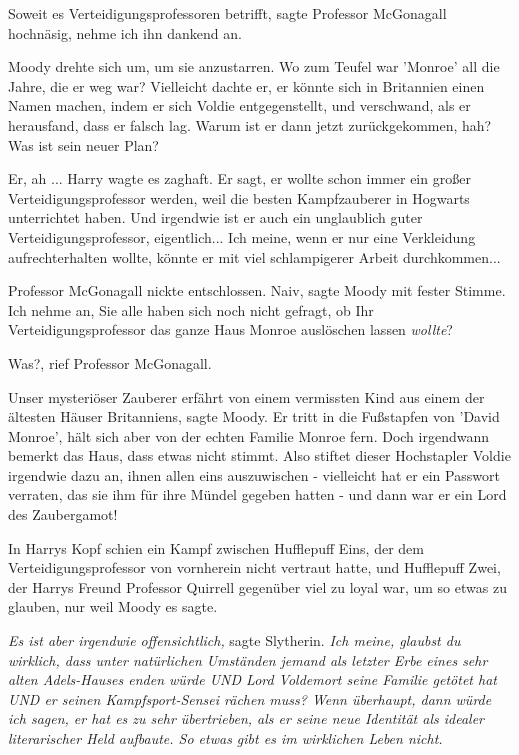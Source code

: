 \glqq Soweit es Verteidigungsprofessoren betrifft\grqq{}, sagte Professor
McGonagall hochnäsig, \glqq nehme ich ihn dankend an.\grqq{}

Moody drehte sich um, um sie anzustarren. \glqq Wo zum Teufel war 'Monroe' all
die Jahre, die er weg war? Vielleicht dachte er, er könnte sich in Britannien
einen Namen machen, indem er sich Voldie entgegenstellt, und verschwand, als er
herausfand, dass er falsch lag. Warum ist er dann jetzt zurückgekommen, hah? Was
ist sein neuer Plan?\grqq{}

\glqq Er, ah ...\grqq{} Harry wagte es zaghaft. \glqq Er sagt, er wollte schon
immer ein großer Verteidigungsprofessor werden, weil die besten Kampfzauberer in
Hogwarts unterrichtet haben. Und irgendwie ist er auch ein unglaublich guter
Verteidigungsprofessor, eigentlich... Ich meine, wenn er nur eine Verkleidung
aufrechterhalten wollte, könnte er mit viel schlampigerer Arbeit
durchkommen...\grqq{}

Professor McGonagall nickte entschlossen. \glqq Naiv\grqq{}, sagte Moody mit
fester Stimme. \glqq Ich nehme an, Sie alle haben sich noch nicht gefragt, ob
Ihr Verteidigungsprofessor das ganze Haus Monroe auslöschen lassen
\emph{wollte}?\grqq{}

\glqq Was?\grqq{}, rief Professor McGonagall.

\glqq Unser mysteriöser Zauberer erfährt von einem vermissten Kind aus einem der
ältesten Häuser Britanniens\grqq{}, sagte Moody. \glqq Er tritt in die
Fußstapfen von 'David Monroe', hält sich aber von der echten Familie Monroe
fern. Doch irgendwann bemerkt das Haus, dass etwas nicht stimmt. Also stiftet
dieser Hochstapler Voldie irgendwie dazu an, ihnen allen eins auszuwischen -
vielleicht hat er ein Passwort verraten, das sie ihm für ihre Mündel gegeben
hatten - und dann war er ein Lord des Zaubergamot!\grqq{}

In Harrys Kopf schien ein Kampf zwischen Hufflepuff Eins, der dem
Verteidigungsprofessor von vornherein nicht vertraut hatte, und Hufflepuff Zwei,
der Harrys Freund Professor Quirrell gegenüber viel zu loyal war, um so etwas zu
glauben, nur weil Moody es sagte.

\emph{Es ist aber irgendwie offensichtlich, }sagte Slytherin. \emph{Ich meine,
glaubst du wirklich, dass unter natürlichen Umständen jemand als letzter Erbe
eines sehr alten Adels-Hauses enden würde UND Lord Voldemort seine Familie
getötet hat UND er seinen Kampfsport-Sensei rächen muss? Wenn überhaupt, dann
würde ich sagen, er hat es zu sehr übertrieben, als er seine neue Identität als
idealer literarischer Held aufbaute. So etwas gibt es im wirklichen Leben nicht.
}

